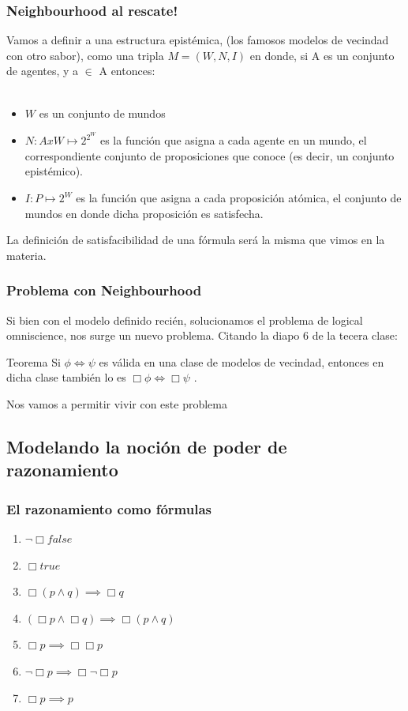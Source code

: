 \documentclass{beamer}
\begin{document}
\begin{frame}
\frametitle{Neighbourhood al rescate!}
Vamos a definir a una estructura epist\'emica, (los famosos modelos de vecindad con otro sabor), como una tripla $M = (W,N,I)$ en donde, si A es un conjunto de agentes, y a $\in$ A entonces: \\~\\
\begin{itemize}
\item $W$ es un conjunto de mundos
\item $N: A x W \mapsto 2^{2^{W}}$ es la funci\'on que asigna a cada agente en un mundo, el correspondiente conjunto de proposiciones que conoce (es decir, un conjunto epist\'emico).
\item $I: P \mapsto 2^{W}$ es la funci\'on que asigna a cada proposici\'on at\'omica, el conjunto de mundos en donde dicha proposici\'on es satisfecha.
\end{itemize}

La definici\'on de satisfacibilidad de una f\'ormula ser\'a la misma que vimos en la materia.
\end{frame}

\begin{frame}
\frametitle{Problema con Neighbourhood}

Si bien con el modelo definido reci\'en, solucionamos el problema de logical omniscience, nos surge un nuevo problema. Citando la diapo 6 de la tecera clase: 

\begin{block}{Teorema}
Si $\phi \iff \psi$ es v\'alida en una clase de modelos de vecindad, entonces en dicha clase tambi\'en lo es $\Box\phi \iff \Box\psi$ .
\end{block} 

Nos vamos a permitir vivir con este problema

\end{frame}

\subsection{Modelando la noci\'on de poder de razonamiento}
\begin{frame}
\frametitle{El razonamiento como f\'ormulas}
\begin{enumerate}
\item $\neg \Box false$
\item $\Box true$
\item $\Box(p \land q)\implies \Box q$
\item $(\Box p \land \Box q)\implies \Box (p \land q)$
\item $\Box p \implies \Box\Box p$
\item $\neg \Box p \implies \Box \neg \Box p$
\item $\Box p \implies p$
\end{enumerate}
\end{frame}
\end{document}
